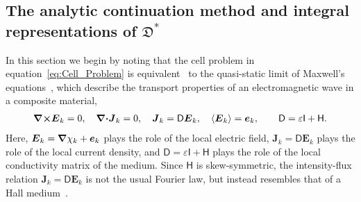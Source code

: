 \documentclass[english,12pt,jmp,graphicx]{revtex4-1}
\newcommand{\vecE}{\boldsymbol{E}}
\newcommand{\vecJ}{\boldsymbol{J}}
\newcommand{\vece}{\boldsymbol{e}}
\newcommand{\appref}[1]{Appendix~\ref{#1}}
\newcommand{\bnabla}{\mbox{\boldmath${\nabla}$}}
\newcommand{\bcdot}{\mbox{\boldmath${\cdot}$}}
\newcommand{\btimes}{\mbox{\boldmath${\times}$}}
\newcommand{\Sg}{\mathfrak{S}}
\newcommand{\Dg}{\mathfrak{D}}
\newcommand{\Dm}{\mathsf{D}}
\newcommand{\Hm}{\mathsf{H}}
\newcommand{\Ib}{\mathsf{I}}
\begin{document}
\subsection{The analytic continuation method and  integral
representations of $\Dg^*$} \label{app:Integral_Reps_Curl_free}  
%
In this section we begin by noting that the cell problem in
equation~\eqref{eq:Cell_Problem} is
equivalent~\cite{Avellaneda:PRL-753,Avellaneda:CMP-339,Fannjiang:1994:SIAM_JAM:333,Fannjiang:1997:1033}
to the quasi-static limit of Maxwell's
equations~\cite{Golden:CMP-473,Milton:2002:TC,Jackson-1999}, which 
describe the transport properties of an electromagnetic wave in a
composite material, 
%
\begin{align}\label{eq:Maxwells_Equations}
  \bnabla\btimes\vecE_k=0, \quad
  \bnabla\bcdot\vecJ_k=0, \quad
  \vecJ_k=\Dm\vecE_k,\quad
  \langle\vecE_k\rangle=\vece_k,\qquad
  \Dm%
       =\varepsilon\Ib+\Hm.
\end{align}
%
Here, $\vecE_k=\bnabla \chi_k+\vece_k$ plays the role of the local
electric field,
$\vecJ_k=\Dm\vecE_k$
plays the role of the local current density, and $\Dm=\varepsilon\Ib+\Hm$ plays
the role of the local conductivity matrix of the medium. Since $\Hm$
is skew-symmetric, the intensity-flux relation $\vecJ_k=\Dm\vecE_k$ is
not the usual Fourier law, but instead resembles that of a Hall
medium~\cite{Isichenko:JNS:1991:375,Fannjiang:1994:SIAM_JAM:333,Fannjiang:1997:1033,Milton:2002:TC}.





\end{document}
